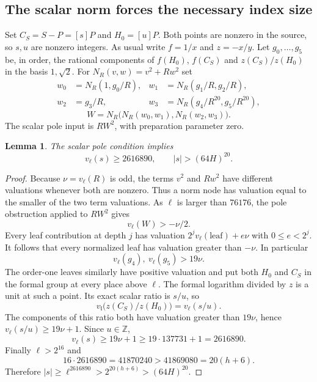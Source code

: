 \documentclass[11pt,a4paper]{article}
\newtheorem{lemma}[theorem]{Lemma}
\theoremstyle{definition}
\theoremstyle{remark}
\begin{document}
\subsection{The scalar norm forces the necessary index size}

Set $C_S=S-P=[s]P$ and $H_0=[u]P$. Both points are nonzero in the
source, so $s,u$ are nonzero integers. As usual write $f=1/x$ and
$z=-x/y$. Let $g_0,\ldots,g_5$ be, in order, the rational components
of $f(H_0)$, $f(C_S)$ and $z(C_S)/z(H_0)$ in the basis
$1,\sqrt2$. For $N_R(v,w)=v^2+Rw^2$ set
\[
 \begin{aligned}
 w_0&=N_R(1,g_0/R),&w_1&=N_R(g_1/R,g_2/R),\\
 w_2&=g_3/R,&w_3&=N_R(g_4/R^{20},g_5/R^{20}),
 \end{aligned}
\]
\[
                  W=N_R\bigl(N_R(w_0,w_1),N_R(w_2,w_3)\bigr).
\]
The scalar pole input is $RW^2$, with preparation parameter zero.

\begin{lemma}
\label{lem:fixed-prime-index}
The scalar pole condition implies
\[
                v_\ell(s)\ge2616890,
                \qquad |s|>(64H)^{20}.
\]
\end{lemma}
\begin{proof}
Because $\nu=v_\ell(R)$ is odd, the terms $v^2$ and $Rw^2$ have
different valuations whenever both are nonzero. Thus a norm node has
valuation equal to the smaller of the two term valuations. As $\ell$
is larger than $76176$, the pole obstruction applied to $RW^2$ gives
\[
                         v_\ell(W)>-\nu/2.
\]
Every leaf contribution at depth $j$ has valuation
$2^jv_\ell(\text{leaf})+e\nu$ with $0\le e<2^j$.
It follows that every normalized leaf has valuation greater than
$-\nu$. In particular
\[
                 v_\ell(g_4),\ v_\ell(g_5)>19\nu.
\]
The order-one leaves similarly have positive valuation and put both
$H_0$ and $C_S$ in the formal group at every place above $\ell$.
The formal logarithm divided by $z$ is a unit at such a point. Its
exact scalar ratio is $s/u$, so
\[
 v_{\mathfrak l}\bigl(z(C_S)/z(H_0)\bigr)
                  =v_\ell(s/u).
\]
The components of this ratio both have valuation greater than
$19\nu$, hence $v_\ell(s/u)\ge19\nu+1$. Since $u\in\mathbb Z$,
\[
 v_\ell(s)\ge19\nu+1\ge19\cdot137731+1=2616890.
\]
Finally $\ell>2^{16}$ and
\[
 16\cdot2616890=41870240
       >41869080=20(h+6).
\]
Therefore $|s|\ge\ell^{2616890}>2^{20(h+6)}>(64H)^{20}$.
\end{proof}
\end{document}
